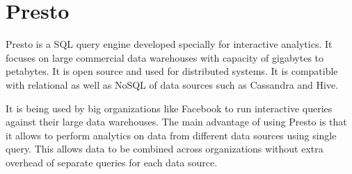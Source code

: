 \section{Presto}

Presto is a SQL query engine developed specially for interactive analytics. It
focuses on large commercial data warehouses with capacity of gigabytes to
petabytes. It is open source and used for distributed systems. It is compatible
with relational as well as NoSQL of data sources such as Cassandra and Hive.

It is being used by big organizations like Facebook to run interactive queries
against their large data warehouses. The main advantage of using Presto is that
it allows to perform analytics on data from different data sources using single
query. This allows data to be combined across organizations without extra
overhead of separate queries for each data source.~\cite{hid-sp18-502-Presto}

